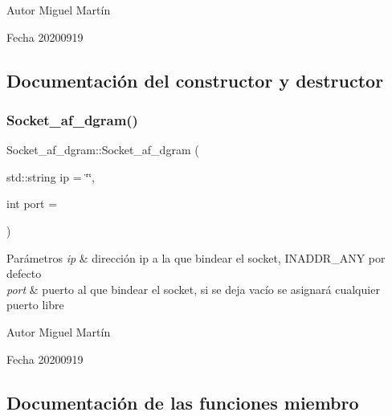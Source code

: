 \begin{DoxyAuthor}{Autor}
Miguel Martín 
\end{DoxyAuthor}
\begin{DoxyDate}{Fecha}
20200919 
\end{DoxyDate}


\subsection{Documentación del constructor y destructor}
\mbox{\label{classSocket__af__dgram_a41bd41eb63d780e446275dc5eb320334}} 
\subsubsection{\texorpdfstring{Socket\+\_\+af\+\_\+dgram()}{Socket\_af\_dgram()}}
{\footnotesize\ttfamily Socket\+\_\+af\+\_\+dgram\+::\+Socket\+\_\+af\+\_\+dgram (\begin{DoxyParamCaption}\item[{std\+::string}]{ip = {\ttfamily \char`\"{}\char`\"{}},  }\item[{int}]{port = {} }\end{DoxyParamCaption})}


\begin{DoxyParams}{Parámetros}
{\em ip} & dirección ip a la que bindear el socket, I\+N\+A\+D\+D\+R\+\_\+\+A\+NY por defecto \\
\hline
{\em port} & puerto al que bindear el socket, si se deja vacío se asignará cualquier puerto libre\\
\hline
\end{DoxyParams}
\begin{DoxyAuthor}{Autor}
Miguel Martín 
\end{DoxyAuthor}
\begin{DoxyDate}{Fecha}
20200919 
\end{DoxyDate}


\subsection{Documentación de las funciones miembro}
\mbox{\label{classSocket__af__dgram_a6a2084d50ab117b0bf6b699aa0573db5}} 
